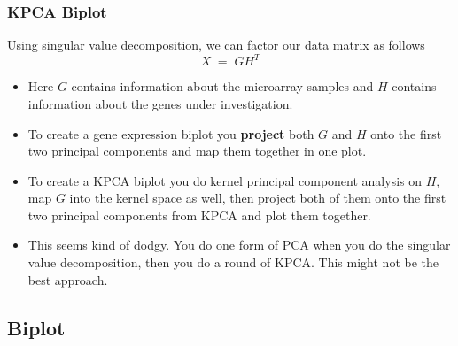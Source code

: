 \documentclass[serif]{beamer}
\begin{document}
		
		\begin{frame}[t]
		\frametitle{KPCA Biplot}
		Using singular value decomposition, we can factor
		our data matrix as follows
		\begin{displaymath}
		 X\;=\;GH^{T}
		\end{displaymath}
		
		{
		\footnotesize
		\begin{itemize}
		\item
		{
		 \color<2-4>{gray10percent}
		 {
		 Here $G$ contains information about the microarray
		 samples and $H$ contains information about the genes
		 under investigation.
		 }
		}
		\item
		{
		 \color<1,3-4>{gray10percent}
		 {
		To create a gene expression biplot you \textbf{project}
		 both $G$ and $H$ onto the first two principal
		 components and map them together in one plot.
		 }
		}
		\item
		{
		 \color<1-2,4>{gray10percent}
		 {
		To create a KPCA biplot you do kernel principal
		 component analysis on $H$, map $G$ into the kernel
		 space as well, then project both of them onto the 
		 first two principal components from KPCA and plot 
		 them together.
		 }
		}
		\item
		{
		 \color<1-3>{gray10percent}
		 {
		This seems kind of dodgy. You do one form of PCA
		 when you do the singular value decomposition, then
		 you do a round of KPCA. This might not be the best
		 approach.
		 }
		}
		\end{itemize}
		}
	\end{frame}	

	
	\subsection{Biplot}
\end{document}
